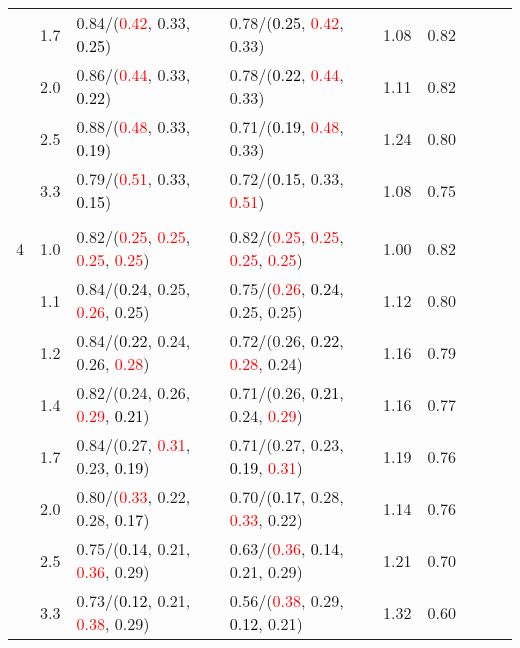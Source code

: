 \documentclass[10pt,a4paper]{report}
\begin{document}
\begin{table}[!htbp]
\begin{center}
{\begin{tabular}{ccllccccc}
			&1.7&0.84/(\textcolor{red}{0.42}, 0.33, \textcolor{black}{0.25})&0.78/(\textcolor{black}{0.25}, \textcolor{red}{0.42}, 0.33)&1.08&0.82\\
			&2.0&0.86/(\textcolor{red}{0.44}, 0.33, \textcolor{black}{0.22})&0.78/(\textcolor{black}{0.22}, \textcolor{red}{0.44}, 0.33)&1.11&0.82\\
			&2.5&0.88/(\textcolor{red}{0.48}, 0.33, \textcolor{black}{0.19})&0.71/(\textcolor{black}{0.19}, \textcolor{red}{0.48}, 0.33)&1.24&0.80\\
			&3.3&0.79/(\textcolor{red}{0.51}, 0.33, \textcolor{black}{0.15})&0.72/(\textcolor{black}{0.15}, 0.33, \textcolor{red}{0.51})&1.08&0.75\\
			&&&&\\
			4			&1.0&0.82/(\textcolor{red}{0.25}, \textcolor{red}{0.25}, \textcolor{red}{0.25}, \textcolor{red}{0.25})&0.82/(\textcolor{red}{0.25}, \textcolor{red}{0.25}, \textcolor{red}{0.25}, \textcolor{red}{0.25})&1.00&0.82\\
			&1.1&0.84/(\textcolor{black}{0.24}, 0.25, \textcolor{red}{0.26}, 0.25)&0.75/(\textcolor{red}{0.26}, \textcolor{black}{0.24}, 0.25, 0.25)&1.12&0.80\\
			&1.2&0.84/(\textcolor{black}{0.22}, 0.24, 0.26, \textcolor{red}{0.28})&0.72/(0.26, \textcolor{black}{0.22}, \textcolor{red}{0.28}, 0.24)&1.16&0.79\\
			&1.4&0.82/(0.24, 0.26, \textcolor{red}{0.29}, \textcolor{black}{0.21})&0.71/(0.26, \textcolor{black}{0.21}, 0.24, \textcolor{red}{0.29})&1.16&0.77\\
			&1.7&0.84/(0.27, \textcolor{red}{0.31}, 0.23, \textcolor{black}{0.19})&0.71/(0.27, 0.23, \textcolor{black}{0.19}, \textcolor{red}{0.31})&1.19&0.76\\
			&2.0&0.80/(\textcolor{red}{0.33}, 0.22, 0.28, \textcolor{black}{0.17})&0.70/(\textcolor{black}{0.17}, 0.28, \textcolor{red}{0.33}, 0.22)&1.14&0.76\\
			&2.5&0.75/(\textcolor{black}{0.14}, 0.21, \textcolor{red}{0.36}, 0.29)&0.63/(\textcolor{red}{0.36}, \textcolor{black}{0.14}, 0.21, 0.29)&1.21&0.70\\
			&3.3&0.73/(\textcolor{black}{0.12}, 0.21, \textcolor{red}{0.38}, 0.29)&0.56/(\textcolor{red}{0.38}, 0.29, \textcolor{black}{0.12}, 0.21)&1.32&0.60\\
			\bottomrule
		\end{tabular}}
	\end{center}
\end{table}
\end{document}

